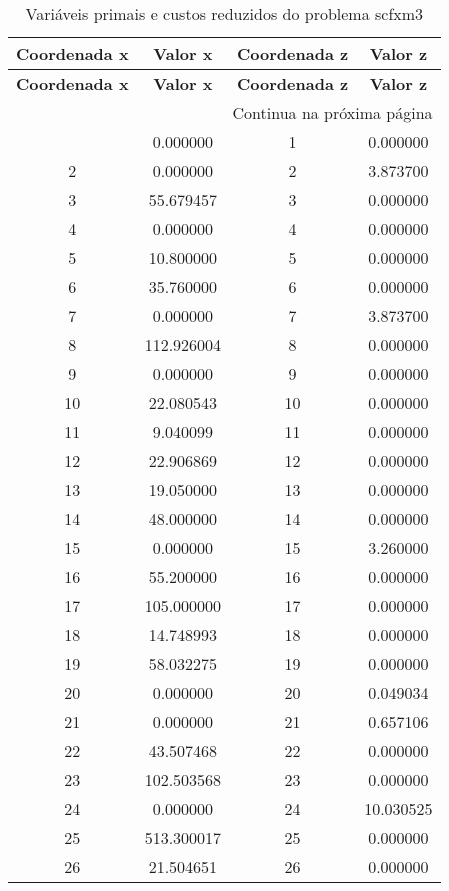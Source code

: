 \documentclass[12pt]{article}
\begin{document}
\begin{longtable}{@{}cccc@{}}
\caption{Variáveis primais e custos reduzidos do problema scfxm3} \\
\toprule
\textbf{Coordenada x} & \textbf{Valor x} & \textbf{Coordenada z} & \textbf{Valor z} \\
\midrule
\endfirsthead

\toprule
\textbf{Coordenada x} & \textbf{Valor x} & \textbf{Coordenada z} & \textbf{Valor z} \\
\midrule
\endhead

\midrule \multicolumn{4}{r}{{Continua na próxima página}} \\ \midrule
\endfoot

\bottomrule
\endlastfoot
1 & 0.000000 & 1 & 0.000000 \\
2 & 0.000000 & 2 & 3.873700 \\
3 & 55.679457 & 3 & 0.000000 \\
4 & 0.000000 & 4 & 0.000000 \\
5 & 10.800000 & 5 & 0.000000 \\
6 & 35.760000 & 6 & 0.000000 \\
7 & 0.000000 & 7 & 3.873700 \\
8 & 112.926004 & 8 & 0.000000 \\
9 & 0.000000 & 9 & 0.000000 \\
10 & 22.080543 & 10 & 0.000000 \\
11 & 9.040099 & 11 & 0.000000 \\
12 & 22.906869 & 12 & 0.000000 \\
13 & 19.050000 & 13 & 0.000000 \\
14 & 48.000000 & 14 & 0.000000 \\
15 & 0.000000 & 15 & 3.260000 \\
16 & 55.200000 & 16 & 0.000000 \\
17 & 105.000000 & 17 & 0.000000 \\
18 & 14.748993 & 18 & 0.000000 \\
19 & 58.032275 & 19 & 0.000000 \\
20 & 0.000000 & 20 & 0.049034 \\
21 & 0.000000 & 21 & 0.657106 \\
22 & 43.507468 & 22 & 0.000000 \\
23 & 102.503568 & 23 & 0.000000 \\
24 & 0.000000 & 24 & 10.030525 \\
25 & 513.300017 & 25 & 0.000000 \\
26 & 21.504651 & 26 & 0.000000 \\

\end{longtable}
\end{document}
